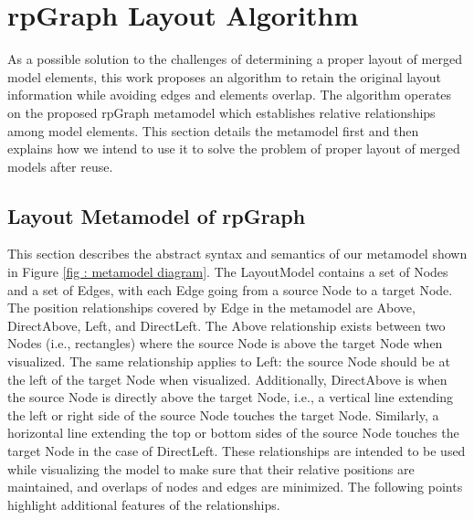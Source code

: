 \section{rpGraph Layout Algorithm}\label{The work}
As a possible solution to the challenges of determining a proper layout of merged model elements, this work proposes an algorithm to retain the original layout information while avoiding edges and elements overlap. The algorithm operates on the proposed rpGraph metamodel which establishes relative relationships among model elements. This section details the metamodel first and then explains how we intend to use it to solve the problem of proper layout of merged models after reuse.

\subsection{Layout Metamodel of rpGraph} \label{metamodel section}
This section describes the abstract syntax and semantics of our metamodel shown in Figure \ref{fig : metamodel diagram}. The LayoutModel contains a set of Nodes and a set of Edges, with each Edge going from a source Node to a target Node. The position relationships covered by Edge in the metamodel are Above, DirectAbove, Left, and DirectLeft. The Above relationship exists between two Nodes (i.e., rectangles) where the source Node is above the target Node when visualized. The same relationship applies to Left: the source Node should be at the left of the target Node when visualized. Additionally, DirectAbove is when the source Node is  directly above the target Node, i.e., a vertical line extending the left or right side of the source Node touches the target Node.  Similarly, a horizontal line extending the top or bottom sides of the source Node touches the target Node in the case of DirectLeft. These relationships are intended to be used while visualizing the model to make sure that their relative positions are maintained, and overlaps of nodes and edges are minimized. The following points highlight additional features of the relationships.

